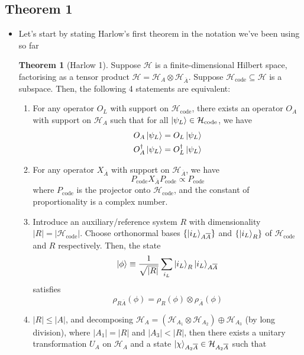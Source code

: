 \documentclass[12pt,a4paper]{article}
\numberwithin{equation}{section}
\newcommand{\Pc}{P_{\text{code}}}
\newcommand{\Hcode}{\mathcal{H}_{\text{code}}}
\theoremstyle{definition}
\theoremstyle{theorem}
\newtheorem{theorem}{Theorem}[section]
\theoremstyle{example}
\begin{document}
	\subsection{Theorem 1}
	\begin{itemize}
		\item Let's start by stating Harlow's first theorem in the notation we've been using so far
		\begin{theorem}[Harlow 1]
			Suppose $\mathcal{H}$ is a finite-dimensional Hilbert space, factorising as a tensor product $\mathcal{H}=\mathcal{H}_{A}\otimes\mathcal{H}_{\overline{A}}$. Suppose $\Hcode\subseteq\mathcal{H}$ is a subspace. Then, the following 4 statements are equivalent:
			\begin{enumerate}
				\item For any operator $O_{L}$ with support on $\Hcode$, there exists an operator $O_{A}$ with support on $\mathcal{H}_{A}$ such that for all $\ket{\psi_{L}}\in\Hcode$, we have
				\begin{equation}
					\begin{aligned}
						O_{A}\ket{\psi_{L}}&=O_{L}\ket{\psi_{L}}\\
						O_{A}^{\dagger}\ket{\psi_{L}}&=O_{L}^{\dagger}\ket{\psi_{L}}
					\end{aligned}
				\end{equation}
				\item For any operator $X_{\overline{A}}$ with support on $\mathcal{H}_{\overline{A}}$, we have
				\begin{equation}
					\Pc X_{\overline{A}}\Pc\propto\Pc
				\end{equation}
				where $\Pc$ is the projector onto $\Hcode$, and the constant of proportionality is a complex number.
				\item Introduce an auxiliary/reference system $R$ with dimensionality $|R|=|\Hcode|$. Choose orthonormal bases $\{\ket{i_{L}}_{A\overline{A}}\}$ and $\{\ket{i_{L}}_{R}\}$ of $\Hcode$ and $R$ respectively. Then, the state
				\begin{equation}
					\ket{\phi}\equiv\frac{1}{\sqrt{|R|}}\sum_{i_{L}}\ket{i_{L}}_{R}\ket{i_{L}}_{A\overline{A}}
				\end{equation}
				satisfies
				\begin{equation}
					\rho_{R\overline{A}}(\phi)=\rho_{R}(\phi)\otimes\rho_{\overline{A}}(\phi)
				\end{equation}
				\item $|R|\leq|A|$, and decomposing $\mathcal{H}_{A}=(\mathcal{H}_{A_{1}}\otimes\mathcal{H}_{A_{2}})\oplus\mathcal{H}_{A_{3}}$ (by long division), where $|A_{1}|=|R|$ and $|A_{3}|<|R|$, then there exists a unitary transformation $U_{A}$ on $\mathcal{H}_{A}$ and a state $\ket{\chi}_{A_{2}\overline{A}}\in\mathcal{H}_{A_{2}\overline{A}}$ such that

\end{enumerate}
\end{theorem}
\end{itemize}
\end{document}
